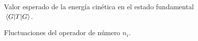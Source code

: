 \documentclass[11pt,letterpaper]{article}
\begin{document}
\begin{figure}%
    \centering
    \caption{Valor esperado de la energía cinética en el estado fundamental
    $\matrixel{G}{T}{G}$.}%
    \label{fig:expVal:T}%
\end{figure}

\begin{figure}%
    \centering
    \caption{Fluctuaciones del operador de número $\hat n_i$.}%
    \label{fig:fluctuations}%
\end{figure}
\end{document}
